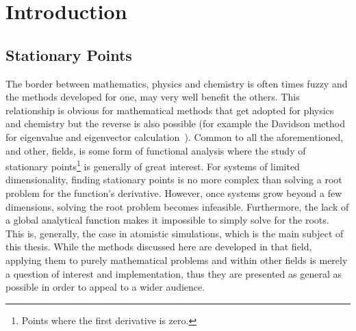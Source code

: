 \chapter{Introduction}
\label{chap:introduction}


\section{Stationary Points}
The border between mathematics, physics and chemistry is often times fuzzy and the methods developed for one, may very well benefit the others.
This relationship is obvious for mathematical methods that get adopted for physics and chemistry but the reverse is also possible (for example the Davidson method for eigenvalue and eigenvector calculation~\cite{davidson-method-1975}).
Common to all the aforementioned, and other, fields, is some form of functional analysis where the study of stationary points\footnote{Points where the first derivative is zero.} is generally of great interest.
For systems of limited dimensionality, finding stationary points is no more complex than solving a root problem for the function's derivative.
However, once systems grow beyond a few dimensions, solving the root problem becomes infeasible.
Furthermore, the lack of a global analytical function makes it impossible to simply solve for the roots.
This is, generally, the case in atomistic simulations, which is the main subject of this thesis.
While the methods discussed here are developed in that field, applying them to purely mathematical problems and within other fields is merely a question of interest and implementation, thus they are presented as general as possible in order to appeal to a wider audience.


